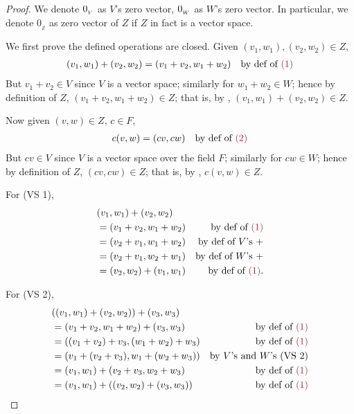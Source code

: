 \begin{proof}
We denote \(0_{_V}\) as \(V\)'s zero vector, \(0_{_W}\) as \(W\)'s zero vector.
In particular, we denote \(0_{_Z}\) as zero vector of \(Z\) if \(Z\) in fact is a vector space.

We first prove the defined operations are closed.
Given \((v_1, w_1), (v_2, w_2) \in Z\),
\begin{align*}
    (v_1, w_1) + (v_2, w_2) & = (v_1 + v_2, w_1 + w_2) & \text{by def of \MAROON{(1)}}
\end{align*}
But \(v_1 + v_2 \in V\) since \(V\) is a vector space; similarly for \(w_1 + w_2 \in W\);
hence by definition of \(Z\), \((v_1 + v_2, w_1 + w_2) \in Z\);
that is, by , \((v_1, w_1) + (v_2, w_2) \in Z\).

Now given \((v, w) \in Z\), \(c \in F\),
\begin{align*}
    c(v, w) & = (c v, c w) & \text{by def of \MAROON{(2)}}
\end{align*}
But \(c v \in V\) since \(V\) is a vector space over the field \(F\); similarly for \(c w \in W\);
hence by definition of \(Z\), \((c v, c w) \in Z\);
that is, by , \(c(v, w) \in Z\).

For (VS 1),
\begin{align*}
    & (v_1, w_1) + (v_2, w_2) \\
    & = (v_1 + v_2, w_1 + w_2) & \text{by def of \MAROON{(1)}} \\
    & = (v_2 + v_1, w_1 + w_2) & \text{by def of \(V\)'s \(+\)} \\
    & = (v_2 + v_1, w_2 + w_1) & \text{by def of \(W\)'s \(+\)} \\
    & = (v_2, w_2) + (v_1, w_1) & \text{by def of \MAROON{(1)}}.
\end{align*}

For (VS 2),
\begin{align*}
    & ((v_1, w_1) + (v_2, w_2)) + (v_3, w_3) \\
    & = (v_1 + v_2, w_1 + w_2) + (v_3, w_3) & \text{by def of \MAROON{(1)}} \\
    & = ((v_1 + v_2) + v_3, (w_1 + w_2) + w_3) & \text{by def of \MAROON{(1)}} \\
    & = (v_1 + (v_2 + v_3), w_1 + (w_2 + w_3)) & \text{by \(V\)'s and \(W\)'s (VS 2)} \\
    & = (v_1, w_1) + (v_2 + v_3, w_2 + w_3) & \text{by def of \MAROON{(1)}} \\
    & = (v_1, w_1) + ((v_2, w_2) + (v_3, w_3)) & \text{by def of \MAROON{(1)}}
\end{align*}


\end{proof}
